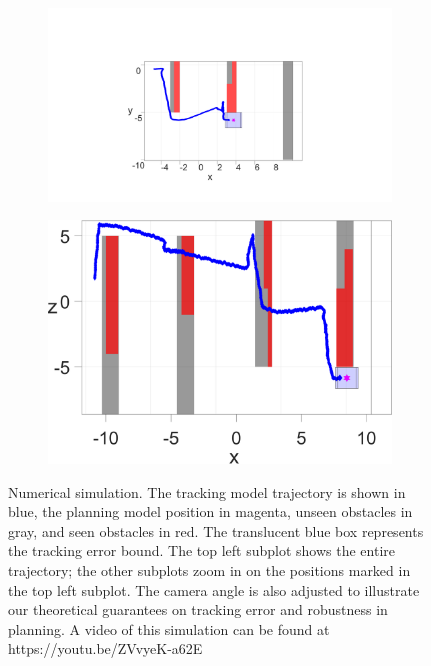 \begin{figure}
	\begin{subfigure}[t]{0.49\columnwidth} \label{subfig:sim_2}
		\includegraphics[width=\columnwidth]{fig/763}
		\caption{}
	\end{subfigure}  
	\begin{subfigure}[t]{0.49\columnwidth} \label{subfig:sim_3}
		\includegraphics[width=\columnwidth]{fig/1042}
		\caption{}
	\end{subfigure}
	\vspace{-.1in}
	\caption{Numerical simulation. The tracking model trajectory is shown in blue, the planning model position in magenta, unseen obstacles in gray, and seen obstacles in red. The translucent blue box represents the tracking error bound. The top left subplot shows the entire trajectory; the other subplots zoom in on the positions marked in the top left subplot. The camera angle is also adjusted to illustrate our theoretical guarantees on tracking error and robustness in planning. A video of this simulation can be found at https://youtu.be/ZVvyeK-a62E \label{fig:sim}}
	\vspace{-.2in}
\end{figure}
